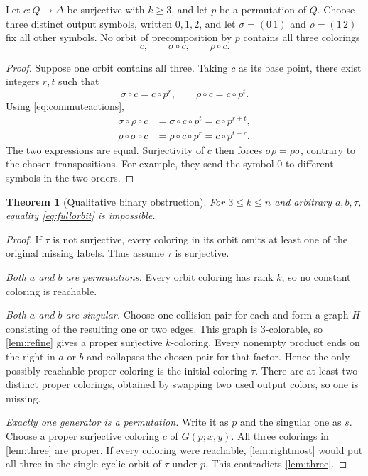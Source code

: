 \documentclass[11pt,a4paper]{article}
\numberwithin{equation}{section}
\newtheorem{theorem}{Theorem}[section]
\theoremstyle{definition}
\theoremstyle{remark}
\newcommand{\D}{\Delta}
\begin{document}
\begin{lemma}\label{lem:three}
Let $c:Q\to\D$ be surjective with $k\ge3$, and let $p$ be a permutation of
$Q$. Choose three distinct output symbols, written $0,1,2$, and let
$\sigma=(0\,1)$ and $\rho=(1\,2)$ fix all other symbols. No orbit of
precomposition by $p$ contains all three colorings
\[
 c,\qquad \sigma\circ c,\qquad \rho\circ c.
\]
\end{lemma}
\begin{proof}
Suppose one orbit contains all three. Taking $c$ as its base point, there
exist integers $r,t$ such that
\[
 \sigma\circ c=c\circ p^r,\qquad
 \rho\circ c=c\circ p^t.
\]
Using \eqref{eq:commuteactions},
\begin{align*}
 \sigma\circ\rho\circ c
 &=\sigma\circ c\circ p^t
 =c\circ p^{r+t},\\
 \rho\circ\sigma\circ c
 &=\rho\circ c\circ p^r
 =c\circ p^{t+r}.
\end{align*}
The two expressions are equal. Surjectivity of $c$ then forces
$\sigma\rho=\rho\sigma$, contrary to the chosen transpositions. For example,
they send the symbol $0$ to different symbols in the two orders.
\end{proof}

\begin{theorem}[Qualitative binary obstruction]\label{thm:qualitative}
For $3\le k\le n$ and arbitrary $a,b,\tau$, equality
\eqref{eq:fullorbit} is impossible.
\end{theorem}
\begin{proof}
If $\tau$ is not surjective, every coloring in its orbit omits at least one
of the original missing labels. Thus assume $\tau$ is surjective.

\emph{Both $a$ and $b$ are permutations.} Every orbit coloring has rank $k$,
so no constant coloring is reachable.

\emph{Both $a$ and $b$ are singular.} Choose one collision pair for each and
form a graph $H$ consisting of the resulting one or two edges. This graph is
$3$-colorable, so \cref{lem:refine} gives a proper surjective $k$-coloring.
Every nonempty product ends on the right in $a$ or $b$ and collapses the
chosen pair for that factor. Hence the only possibly reachable proper
coloring is the initial coloring $\tau$. There are at least two distinct
proper colorings, obtained by swapping two used output colors, so one is
missing.

\emph{Exactly one generator is a permutation.} Write it as $p$ and the
singular one as $s$. Choose a proper surjective coloring $c$ of
$G(p;x,y)$. All three colorings in \cref{lem:three} are proper. If every
coloring were reachable, \cref{lem:rightmost} would put all three in the
single cyclic orbit of $\tau$ under $p$. This contradicts \cref{lem:three}.
\end{proof}
\end{document}
